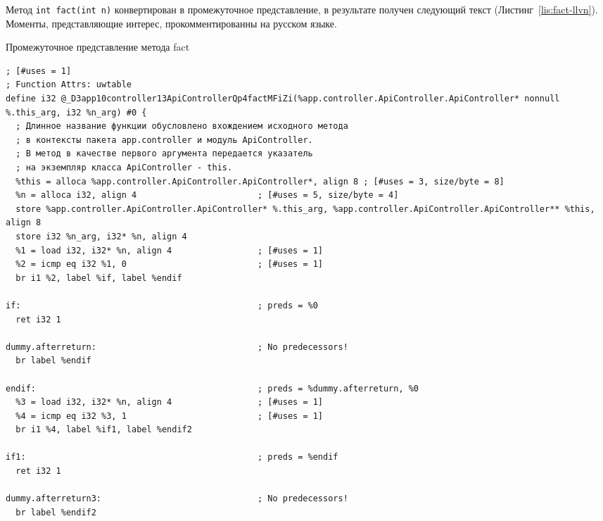\documentclass{studrep}
\begin{document}
Метод \verb-int fact(int n)- конвертирован в промежуточное представление, в результате получен следующий текст (Листинг~\ref{lis:fact-llvn}).  Моменты, представляющие интерес, прокомментированны на русском языке.

\begin{listing}[H]
\caption{Промежуточное представление метода fact}
\begin{verbatim}
; [#uses = 1]
; Function Attrs: uwtable
define i32 @_D3app10controller13ApiControllerQp4factMFiZi(%app.controller.ApiController.ApiController* nonnull %.this_arg, i32 %n_arg) #0 {
  ; Длинное название функции обусловлено вхождением исходного метода
  ; в контексты пакета app.controller и модуль ApiController.
  ; В метод в качестве первого аргумента передается указатель
  ; на экземпляр класса ApiController - this.
  %this = alloca %app.controller.ApiController.ApiController*, align 8 ; [#uses = 3, size/byte = 8]
  %n = alloca i32, align 4                        ; [#uses = 5, size/byte = 4]
  store %app.controller.ApiController.ApiController* %.this_arg, %app.controller.ApiController.ApiController** %this, align 8
  store i32 %n_arg, i32* %n, align 4
  %1 = load i32, i32* %n, align 4                 ; [#uses = 1]
  %2 = icmp eq i32 %1, 0                          ; [#uses = 1]
  br i1 %2, label %if, label %endif

if:                                               ; preds = %0
  ret i32 1

dummy.afterreturn:                                ; No predecessors!
  br label %endif

endif:                                            ; preds = %dummy.afterreturn, %0
  %3 = load i32, i32* %n, align 4                 ; [#uses = 1]
  %4 = icmp eq i32 %3, 1                          ; [#uses = 1]
  br i1 %4, label %if1, label %endif2

if1:                                              ; preds = %endif
  ret i32 1

dummy.afterreturn3:                               ; No predecessors!
  br label %endif2


\end{verbatim}
\end{listing}
\end{document}
